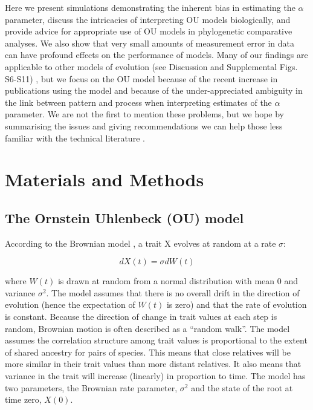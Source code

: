 \documentclass[a4paper,12pt]{article}
\begin{document}
  Here we present simulations demonstrating the inherent bias in estimating the $\alpha$ parameter, discuss the intricacies of interpreting OU models biologically, and provide advice for appropriate use of OU models in phylogenetic comparative analyses. We also show that very small amounts of measurement error in data can have profound effects on the performance of models. 
  Many of our findings are applicable to other models of evolution (see Discussion and Supplemental Figs. S6-S11) 
  , but we focus on the OU model because of the recent increase in publications using the model and because of the under-appreciated ambiguity in the link between pattern and process when interpreting estimates of the $\alpha$ parameter. 
  We are not the first to mention these problems, but we hope by summarising the issues and giving recommendations we can help those less familiar with the technical literature \citep[e.g.,][]{ho2013asymptotic,ho2014intrinsic,boettiger2012your,hansen2012interpreting,ives2010phylogenetic}.

\section{Materials and Methods}
  \subsection{The Ornstein Uhlenbeck (OU) model}
    According to the Brownian model \citep{cavalli1967,felsenstein1973maximum}, a trait X evolves at random at a rate $\sigma$:

      \begin{equation}
        dX(t) = \sigma dW(t)
      \end{equation}

    where $W(t)$ is drawn at random from a normal distribution with mean $0$ and variance $\sigma^2$. 
    The model assumes that there is no overall drift in the direction of evolution (hence the expectation of $W(t)$ is zero) and that the rate of evolution is constant. 
    Because the direction of change in trait values at each step is random, Brownian motion is often described as a ``random walk''.
    The model assumes the correlation structure among trait values is proportional to the extent of shared ancestry for pairs of species. 
    This means that close relatives will be more similar in their trait values than more distant relatives. It also means that variance in the trait will increase (linearly) in proportion to time. 
    The model has two parameters, the Brownian rate parameter, $\sigma^2$ and the state of the root at time zero, $X(0)$. 
\end{document}
